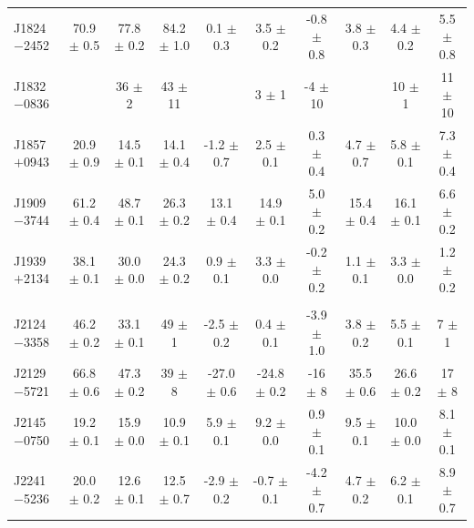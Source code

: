 \documentclass[useAMS,usenatbib]{mn2e}
\begin{document}
\begin{table}
\begin{center}
\begin{tabular}{lccccccccc}
J1824$-$2452& 70.9 $\pm$ 0.5& 77.8 $\pm $ 0.2& 84.2 $\pm$ 1.0& 0.1  $\pm$ 0.3 &  3.5 $\pm$ 0.2 & -0.8 $\pm$ 0.8 &  3.8 $\pm$ 0.3 &  4.4 $\pm$ 0.2 & 5.5  $\pm$ 0.8 \\
J1832$-$0836&               & 36   $\pm $ 2  & 43   $\pm$ 11 &                &   3  $\pm$ 1   &   -4 $\pm$ 10  &                &   10 $\pm$ 1   & 11   $\pm$ 10   \\
J1857$+$0943& 20.9 $\pm$ 0.9& 14.5 $\pm $ 0.1& 14.1 $\pm$ 0.4& -1.2 $\pm$ 0.7 &  2.5 $\pm$ 0.1 &  0.3 $\pm$ 0.4 &  4.7 $\pm$ 0.7 &  5.8 $\pm$ 0.1 & 7.3  $\pm$ 0.4 \\
J1909$-$3744& 61.2 $\pm$ 0.4& 48.7 $\pm $ 0.1& 26.3 $\pm$ 0.2& 13.1 $\pm$ 0.4 & 14.9 $\pm$ 0.1 &  5.0 $\pm$ 0.2 & 15.4 $\pm$ 0.4 & 16.1 $\pm$ 0.1 & 6.6  $\pm$ 0.2 \\
J1939$+$2134& 38.1 $\pm$ 0.1& 30.0 $\pm $ 0.0& 24.3 $\pm$ 0.2& 0.9  $\pm$ 0.1 &  3.3 $\pm$ 0.0 & -0.2 $\pm$ 0.2 &  1.1 $\pm$ 0.1 &  3.3 $\pm$ 0.0 & 1.2  $\pm$ 0.2 \\
            &               &                &               &                &                &                &                &                &               \\
J2124$-$3358& 46.2 $\pm$ 0.2& 33.1 $\pm $ 0.1& 49   $\pm$ 1  & -2.5 $\pm$ 0.2 &  0.4 $\pm$ 0.1 & -3.9 $\pm$ 1.0 &  3.8 $\pm$ 0.2 &  5.5 $\pm$ 0.1 & 7    $\pm$ 1   \\
J2129$-$5721& 66.8 $\pm$ 0.6& 47.3 $\pm $ 0.2& 39   $\pm$ 8  &-27.0 $\pm$ 0.6 &-24.8 $\pm$ 0.2 & -16  $\pm$ 8   & 35.5 $\pm$ 0.6 & 26.6 $\pm$ 0.2 & 17   $\pm$ 8  \\
J2145$-$0750& 19.2 $\pm$ 0.1& 15.9 $\pm $ 0.0& 10.9 $\pm$ 0.1&  5.9 $\pm$ 0.1 &  9.2 $\pm$ 0.0 &  0.9 $\pm$ 0.1 &  9.5 $\pm$ 0.1 & 10.0 $\pm$ 0.0 & 8.1  $\pm$ 0.1 \\
J2241$-$5236& 20.0 $\pm$ 0.2& 12.6 $\pm $ 0.1& 12.5 $\pm$ 0.7& -2.9 $\pm$ 0.2 & -0.7 $\pm$ 0.1 & -4.2 $\pm$ 0.7 &  4.7 $\pm$ 0.2 &  6.2 $\pm$ 0.1 & 8.9  $\pm$ 0.7 \\

\end{tabular}
\end{center}
\end{table}
\end{document}
